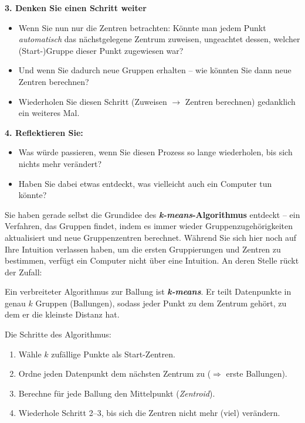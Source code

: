\begin{lpu}
\begin{aufgabe}{2}
\vspace{1em}
\textbf{3. Denken Sie einen Schritt weiter}

\begin{itemize}
  \item Wenn Sie nun nur die Zentren betrachten: Könnte man jedem Punkt \emph{automatisch} das nächstgelegene Zentrum zuweisen, ungeachtet dessen, welcher (Start-)Gruppe dieser Punkt zugewiesen war?
  \item Und wenn Sie dadurch neue Gruppen erhalten – wie könnten Sie dann neue Zentren berechnen?
  \item Wiederholen Sie diesen Schritt (Zuweisen $\rightarrow$ Zentren berechnen) gedanklich ein weiteres Mal.
\end{itemize}

\vspace{1em}
\textbf{4. Reflektieren Sie:}

\begin{itemize}
  \item Was würde passieren, wenn Sie diesen Prozess so lange wiederholen, bis sich nichts mehr verändert?
  \item Haben Sie dabei etwas entdeckt, was vielleicht auch ein Computer tun könnte?
\end{itemize}
\end{aufgabe}

Sie haben gerade selbst die Grundidee des \textbf{\textit{k-means}-Algorithmus} entdeckt – ein Verfahren, das Gruppen findet, indem es immer wieder Gruppenzugehörigkeiten aktualisiert und neue Gruppenzentren berechnet. Während Sie sich hier noch auf Ihre Intuition verlassen haben, um die ersten Gruppierungen und Zentren zu bestimmen, verfügt ein Computer nicht über eine Intuition. An deren Stelle rückt der Zufall:

\begin{theorie}
Ein verbreiteter Algorithmus zur Ballung ist \textbf{\textit{k-means}}. Er teilt Datenpunkte in genau $k$ Gruppen (Ballungen), sodass jeder Punkt zu dem Zentrum gehört, zu dem er die kleinste Distanz hat.

Die Schritte des Algorithmus:
\begin{enumerate}
  \item Wähle $k$ zufällige Punkte als Start-Zentren.
  \item Ordne jeden Datenpunkt dem nächsten Zentrum zu ($\Rightarrow$ erste Ballungen).
  \item Berechne für jede Ballung den Mittelpunkt (\textit{Zentroid}).
  \item Wiederhole Schritt 2–3, bis sich die Zentren nicht mehr (viel) verändern.
\end{enumerate}


\end{theorie}
\end{lpu}
